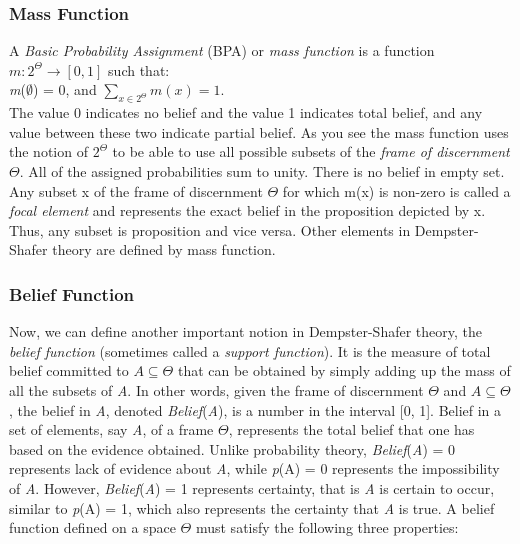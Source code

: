 \documentclass[11pt]{article}
\begin{document}
\subsubsection{Mass Function}

A \textit{Basic Probability Assignment} (BPA) or \textit{mass function}
is a function $m:2^\Theta\rightarrow[0,1]$ such that:\\

\textit{m}($\emptyset$) = 0, and $\sum\limits_{x\in2^\Theta}m(x) =1$.\\

The value 0 indicates no belief and the value 1 indicates total belief, and
any value between these two indicate partial belief. As you see the mass
function uses the notion of $2^\Theta$ to be able to use all possible subsets of
the \textit{frame of discernment} $\Theta$. All of the assigned probabilities
sum to unity. There is no belief in empty set. Any subset x of the frame of
discernment $\Theta$ for which m(x) is non-zero is called a \textit{focal
element} and represents the exact belief in the proposition depicted by x. Thus,
any subset is proposition and vice versa. Other elements in Dempster-Shafer
theory are defined by mass function. 

\subsubsection{Belief Function}

Now, we can define another important notion in Dempster-Shafer theory, the
\textit{belief function} (sometimes called a \textit{support function}). It is
the measure of total belief committed to $A \subseteq \Theta$ that can be
obtained by simply adding up the mass of all the subsets of \textit{A}. In other
words, given the frame of discernment $\Theta$ and $A \subseteq \Theta$, the
belief in \textit{A}, denoted \textit{Belief}(\textit{A}), is a number in the
interval [0, 1]. Belief in a set of elements, say \textit{A}, of a frame
$\Theta$, represents the total belief that one has based on the evidence
obtained. Unlike probability theory, \textit{Belief}(\textit{A}) = 0 represents
lack of evidence about \textit{A}, while \textit{p}(A) = 0 represents the
impossibility of \textit{A}. However, \textit{Belief}(\textit{A}) = 1 represents
certainty, that is \textit{A} is certain to occur, similar to \textit{p}(A) = 1,
which also represents the certainty that \textit{A} is true. A belief function
defined on a space $\Theta$ must satisfy the following three properties:
\end{document}
